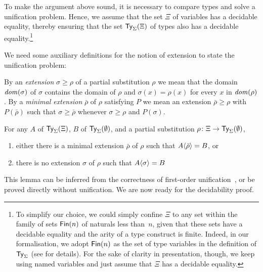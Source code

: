 \begin{remark}
To make the argument above sound, it is necessary to compare types and solve a unification problem.
Hence, we assume that the set\/ $\Xi$ of variables has a decidable equality, thereby ensuring that the set $\mathsf{Ty}_{\Sigma}(\Xi)$ of types also has a decidable equality.\footnote{%
To simplify our choice, we could simply confine $\Xi$ to any set within the family of sets $\mathsf{Fin}(n)$ of naturals less than~$n$, given that these sets have a decidable equality and the arity of a type construct is finite.
Indeed, in our formalisation, we adopt $\mathsf{Fin}(n)$ as the set of type variables in the definition of $\mathsf{Ty}_{\Sigma}$ (see  for details).
For the sake of clarity in presentation, though, we keep using named variables and just assume that $\Xi$ has a decidable equality.}
\end{remark}
We need some auxiliary definitions for the notion of extension to state the unification problem:
\begin{definition}
By an \emph{extension}\/ $\sigma \geq \rho$ of a partial substitution $\rho$ we mean that the domain $\mathit{dom}(\sigma)$ of $\sigma$ contains the domain of $\rho$ and $\sigma(x) = \rho(x)$ for every\/ $x$ in $\mathit{dom}(\rho)$.
  By a \emph{minimal extension}\/ $\bar{\rho}$ of $\rho$ satisfying $P$ we mean an extension $\bar{\rho} \geq \rho$ with $P(\bar{\rho})$ such that $\sigma \geq \bar{\rho}$ whenever $\sigma \geq \rho$ and $P(\sigma)$.
\end{definition}
\begin{lemma}\label{lem:unify}
  For any\/ $A$ of\/ $\mathsf{Ty}_{\Sigma}(\Xi)$, $B$ of\/ $\mathsf{Ty}_{\Sigma}(\emptyset)$, and a partial substitution\/ $\rho \colon \Xi \to \mathsf{Ty}_{\Sigma}(\emptyset)$, 
  \begin{enumerate}
    \item either there is a minimal extension\/ $\bar{\rho}$ of\/ $\rho$ such that\/ ${A}\!\left<{\bar{\rho}}\right> = B$, or 
    \item there is no extension\/ $\sigma$ of\/ $\rho$ such that\/ ${A}\!\left<{\sigma}\right> = B$
  \end{enumerate}
\end{lemma}
This lemma can be inferred from the correctness of first-order unification~\citep{McBride2003,McBride2003a}, or be proved directly without unification.
We are now ready for the decidability proof.

